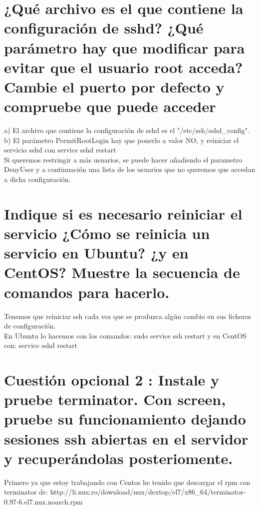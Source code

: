 \section{¿Qué archivo es el que contiene la configuración de sshd? ¿Qué parámetro hay que modificar para evitar que el usuario root acceda? Cambie el puerto por defecto y compruebe que puede acceder \cite{08c01}}


a) El archivo que contiene la configuración de sshd es el "/etc/ssh/sshd\_config".\\
b) El parámetro PermitRootLogin hay que ponerlo a valor NO, y reiniciar el servicio sshd con service sshd restart \\
Si queremos restringir a más usuarios, se puede hacer añadiendo el parametro DenyUser y a continuación una lista de los usuarios que no queremos que accedan a dicha configuración.\\

\section{Indique si es necesario reiniciar el servicio ¿Cómo se reinicia un servicio en Ubuntu? ¿y en CentOS? Muestre la secuencia de comandos para hacerlo. \cite{09c01} \cite{09c02}}

Tenemos que reiniciar ssh cada vez que se produzca algún cambio en sus ficheros de configuración. \\
En Ubuntu lo hacemos con los comandos: sudo service ssh restart y en CentOS con: service sshd restart 


\section{Cuestión opcional 2 : Instale y pruebe terminator. Con screen, pruebe su funcionamiento dejando sesiones ssh abiertas en el servidor y recuperándolas posteriomente.}

Primero ya que estoy trabajando con Centos he tenido que descargar el rpm con terminator de: http://li.nux.ro/download/nux/dextop/el7/x86\_64/terminator-0.97-6.el7.nux.noarch.rpm \\

